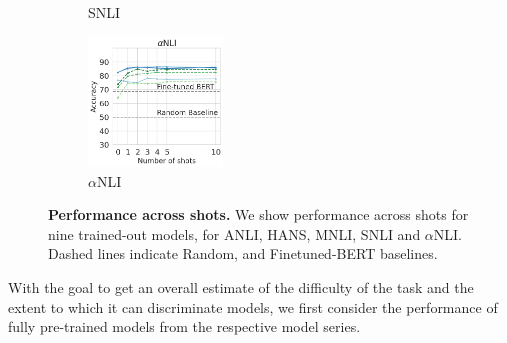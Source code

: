 \begin{figure}[t]
\begin{subfigure}[b]{0.19\textwidth}
    \caption{SNLI}
    \label{fig:snli}
    \end{subfigure}
    \begin{subfigure}[b]{0.19\textwidth}
    \centering
    \includegraphics[height=3.45cm, trim=25mm 0 0 0, clip]{figures/abductivenli}
    \caption{$\alpha$NLI}
    \label{fig:alphanli}
    \end{subfigure}
    \caption{\textbf{Performance across shots.} We show performance across shots for nine trained-out models, for ANLI, HANS, MNLI, SNLI and $\alpha$NLI. Dashed lines indicate Random, and Finetuned-BERT baselines.}\label{fig:shot_performance}
\end{figure}


With the goal to get an overall estimate of the difficulty of the task and the extent to which it can discriminate models, we first consider the performance of fully pre-trained models from the respective model series.

